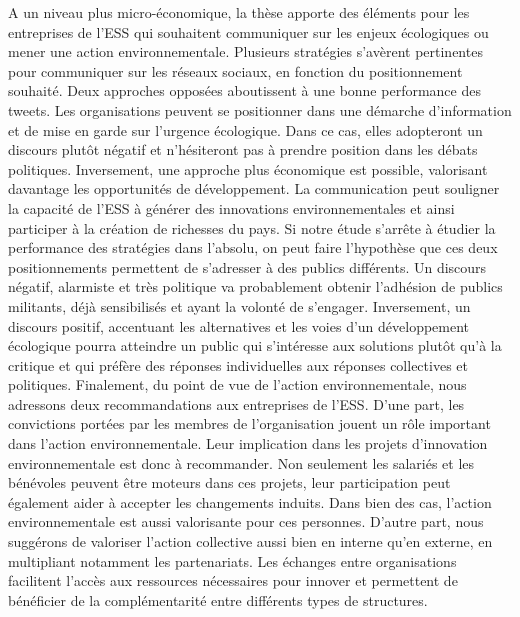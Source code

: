         A un niveau plus micro-économique, la thèse apporte des éléments pour les entreprises de l'ESS qui souhaitent communiquer sur les enjeux écologiques ou mener une action environnementale. Plusieurs stratégies  s'avèrent pertinentes pour communiquer sur les réseaux sociaux, en fonction du positionnement souhaité. Deux approches opposées aboutissent à une bonne performance des tweets. Les organisations peuvent se positionner dans une démarche d'information et de mise en garde sur l'urgence écologique. Dans ce cas, elles adopteront un discours plutôt négatif et n'hésiteront pas à prendre position dans les débats politiques. Inversement, une approche plus économique est possible, valorisant davantage les opportunités de développement. La communication peut souligner la capacité de l'ESS à générer des innovations environnementales et ainsi participer à la création de richesses du pays. Si notre étude s'arrête à étudier la performance des stratégies dans l'absolu, on peut faire l'hypothèse que ces deux positionnements permettent de s'adresser à des publics différents. Un discours négatif, alarmiste et très politique va probablement obtenir l'adhésion de publics militants, déjà sensibilisés et ayant la volonté de s'engager. Inversement, un discours positif, accentuant les alternatives et les voies d'un développement écologique pourra atteindre un public qui s'intéresse aux solutions plutôt qu'à la critique et qui préfère des réponses individuelles aux réponses collectives et politiques. Finalement, du point de vue de l'action environnementale, nous adressons deux recommandations aux entreprises de l'ESS. D'une part, les convictions portées par les membres de l'organisation jouent un rôle important dans l'action environnementale. Leur implication dans les projets d'innovation environnementale est donc à recommander. Non seulement les salariés et les bénévoles peuvent être moteurs dans ces projets, leur participation peut également aider à accepter les changements induits. Dans bien des cas, l'action environnementale est aussi valorisante pour ces personnes. D'autre part, nous suggérons de valoriser l'action collective aussi bien en interne qu'en externe, en multipliant notamment les partenariats. Les échanges entre organisations facilitent l'accès aux ressources nécessaires pour innover et permettent de bénéficier de la complémentarité entre différents types de structures.



